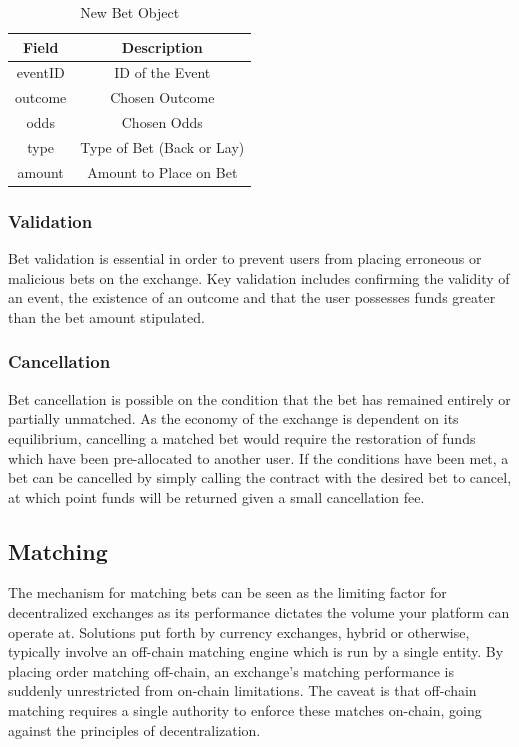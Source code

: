 \documentclass{article}
\begin{document}
\begin{table}[!htb]
\centering
\caption{New Bet Object}

\begin{tabular}{ c c }
\bfseries{Field} & \bfseries{Description} \\
\hline

eventID & ID of the Event \\
\hline
outcome & Chosen Outcome \\
\hline
odds & Chosen Odds \\
\hline
type & Type of Bet (Back or Lay) \\
\hline
amount & Amount to Place on Bet \\
\hline

\end{tabular}
\label{table:bets}
\end{table}

	\subsubsection{Validation} \label{validation}
Bet validation is essential in order to prevent users from placing erroneous or malicious bets on the exchange. Key validation includes confirming the validity of an event, the existence of an outcome and that the user possesses funds greater than the bet amount stipulated.

\subsubsection{Cancellation} \label{cancellation}
Bet cancellation is possible on the condition that the bet has remained entirely or partially unmatched. As the economy of the exchange is dependent on its equilibrium, cancelling a matched bet would require the restoration of funds which have been pre-allocated to another user. If the conditions have been met, a bet can be cancelled by simply calling the contract with the desired bet to cancel, at which point funds will be returned given a small cancellation fee.

	\subsection{Matching} \label{matching}
The mechanism for matching bets can be seen as the limiting factor for decentralized exchanges as its performance dictates the volume your platform can operate at. Solutions put forth by currency exchanges, hybrid or otherwise, typically involve an off-chain matching engine which is run by a single entity. By placing order matching off-chain, an exchange’s matching performance is suddenly unrestricted from on-chain limitations. The caveat is that off-chain matching requires a single authority to enforce these matches on-chain, going against the principles of decentralization.
\end{document}
